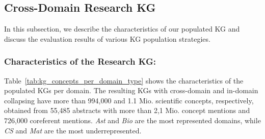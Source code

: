 \documentclass[runningheads]{llncs}
\begin{document}
\subsection{Cross-Domain Research KG}
In this subsection, we describe the characteristics of our populated KG and discuss the evaluation results of various KG population strategies.

\subsubsection{Characteristics of the Research KG:}

Table~\ref{tab:kg_concepts_per_domain_type} shows the characteristics of the populated KGs per domain.
The resulting KGs with cross-domain and in-domain collapsing have more than 994,000 and 1.1 Mio. scientific concepts, respectively, obtained from 55,485 abstracts with more than 2,1 Mio. concept mentions and 726,000 coreferent mentions.
\emph{Ast} and \emph{Bio} are the most represented domains, while \emph{CS} and \emph{Mat} are the most underrepresented.
\end{document}

